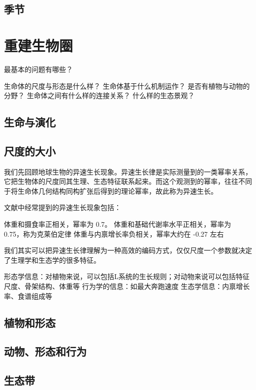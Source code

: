 \documentclass[a4paper,10.5pt]{book}
\begin{document}
\section{季节}




\chapter{重建生物圈}

最基本的问题有哪些？

生命体的尺度与形态是什么样？
生命体基于什么机制运作？
是否有植物与动物的分野？
生命体之间有什么样的连接关系？
什么样的生态景观？

\section{生命与演化}

\section{尺度的大小}

我们先回顾地球生物的异速生长现象。异速生长律是实际测量到的一类幂率关系，
它把生物体的尺度同其生理、生态特征联系起来。而这个观测到的幂率，往往不同于将生命体几何结构同构扩张后得到的理论幂率，故此称为异速生长。

文献中经常提到的异速生长现象包括：

体重和摄食率正相关，幂率为 0.7。
体重和基础代谢率水平正相关，幂率为 0.75，称为克莱伯定律
体重与内禀增长率负相关，幂率大约在 -0.27 左右

我们其实可以把异速生长律理解为一种高效的编码方式，仅仅尺度一个参数就决定了生理学和生态学的很多特征。

形态学信息：对植物来说，可以包括L系统的生长规则；对动物来说可以包括特征尺度、骨架结构、体重等
行为学的信息：如最大奔跑速度
生态学信息：内禀增长率、食谱组成等

\section{植物和形态}

\section{动物、形态和行为}

\section{生态带}
\end{document}
